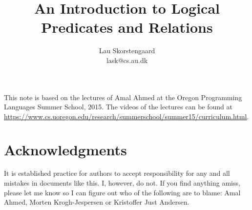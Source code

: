 \documentclass[a4paper,10pt,fleqn]{article}
\author{Lau Skorstengaard\\lask@cs.au.dk}
\title{An Introduction to Logical Predicates and Relations}
\begin{document}
\maketitle This note is based on the lectures of Amal Ahmed at the Oregon Programming Languages Summer School, 2015. The videos of the lectures can be found at \url{https://www.cs.uoregon.edu/research/summerschool/summer15/curriculum.html}. 

\section*{Acknowledgments} It is established practice for authors to accept responsibility for any and all mistakes in documents like this. I, however, do not. If
you find anything amiss, please let me know so I can figure out who of the following are to blame: Amal Ahmed, Morten Krogh-Jespersen or Kristoffer Just Andersen.
\end{document}
